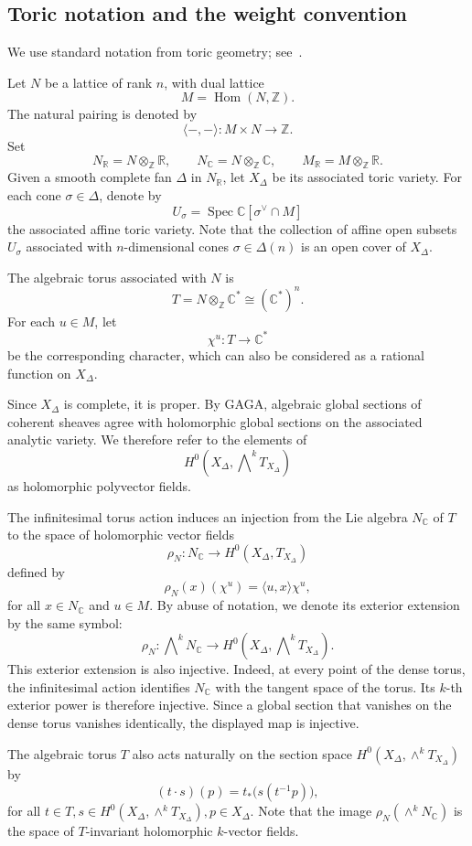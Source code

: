 \documentclass[colorlinks,11pt,reqno]{amsart}
\theoremstyle{definition}
\theoremstyle{remark}
\numberwithin{equation}{section}
\numberwithin{equation}{section}
\newcommand{\C}{\mathbb{C}}
\newcommand{\R}{\mathbb{R}}
\newcommand{\Z}{\mathbb{Z}}
\DeclareMathOperator{\Spec}{Spec}
\DeclareMathOperator{\Hom}{Hom}
\begin{document}
\subsection{Toric notation and the weight convention}

We use standard notation from toric geometry; see~\cites{Cox, Fulton}.

Let $N$ be a lattice of rank $n$, with dual lattice
\[
M=\Hom(N, \Z).
\]
The natural pairing is denoted by
\[
\langle -,- \rangle \colon M \times N\longrightarrow\Z.
\]
Set
\[
N_{\R}= N\otimes_{\Z}\R, \qquad N_{\C}=N\otimes_{\Z}\C,\qquad  M_{\R}=M\otimes_{\Z}\R.
\]
Given a smooth complete fan $\Delta$ in $N_{\R}$, let $X_\Delta$ be its associated toric variety. For each cone $\sigma \in \Delta$, denote by
\[
U_\sigma=\Spec\C [\sigma^\vee \cap M]
\]
the associated affine toric variety.
Note that the collection of affine open subsets $U_\sigma$ associated with $n$-dimensional cones $\sigma \in \Delta(n)$ is an open cover of $X_\Delta$.

The algebraic torus associated with $N$ is
\[
T= N\otimes_{\Z} \C^\ast  \cong (\C^\ast)^n.
\]
For each $u \in M$, let
\[
\chi^u\colon T \longrightarrow \C^\ast
\]
be the corresponding character, which can also be considered as a rational function on $X_\Delta$.

Since $X_\Delta$ is complete, it is proper. By GAGA, algebraic global sections of coherent sheaves agree with holomorphic global sections on the associated analytic variety. We therefore refer to
the elements of
\[
H^0\!\left(X_\Delta,\bigwedge\nolimits^kT_{X_\Delta}\right)
\]
as holomorphic polyvector fields.

The infinitesimal torus action induces an injection from the Lie algebra $N_\C$ of $T$ to the space of holomorphic vector fields
\[
\rho_N \colon N_{\C} \longrightarrow  H^0(X_\Delta,T_{X_\Delta})
\]
defined by
\[
\rho_N(x)(\chi^u) = \langle u, x \rangle \chi^u,
\]
for all $x \in N_\C$ and $u \in M$.
By abuse of notation, we denote its exterior extension by the same symbol:
\[
\rho_N \colon \bigwedge\nolimits^k N_{\C} \longrightarrow
H^0\!\left(X_\Delta, \bigwedge\nolimits^k T_{X_\Delta} \right).
\]
This exterior extension is also injective. Indeed, at every point of the dense torus, the infinitesimal action identifies $N_{\C}$ with the tangent space of the torus. Its $k$-th exterior power is therefore injective. Since a global section that vanishes on the dense torus vanishes identically, the displayed map is injective.

The algebraic torus $T$ also acts naturally on the section space $H^0\left(X_\Delta, \wedge^kT_{X_\Delta}\right)$ by
\begin{equation}\label{eq:section-action}
(t\cdot s)(p) = t_\ast \bigl(s(t^{-1}p)\bigr),
\end{equation}
for all $t \in T, s \in H^0\left(X_\Delta, \wedge^kT_{X_\Delta}\right), p \in X_\Delta$.
Note that the image $\rho_N(\wedge^k N_\C)$ is the space of $T$-invariant holomorphic $k$-vector fields.
\end{document}
